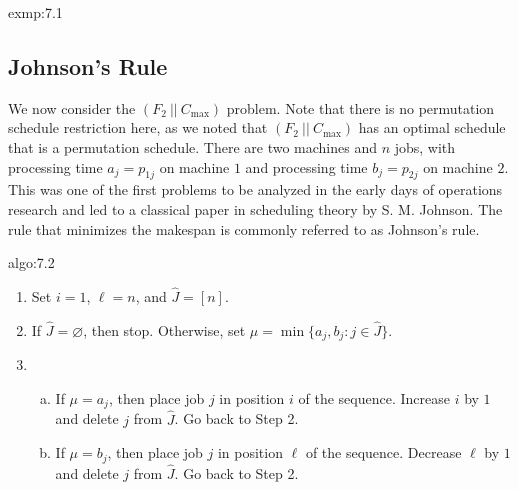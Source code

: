 \begin{exmp}{exmp:7.1}
\begin{center}
    \end{center}
\end{exmp}

\subsection{Johnson's Rule} \label{subsec:7.2}
We now consider the $(F_2~||~C_{\max})$ problem. Note that there 
is no permutation schedule restriction here, as we noted that 
$(F_2~||~C_{\max})$ has an optimal schedule that is a permutation schedule. 
There are two machines and $n$ jobs, with processing time $a_j = p_{1j}$ on 
machine $1$ and processing time $b_j = p_{2j}$ on machine $2$. This was one of 
the first problems to be analyzed in the early days of operations research 
and led to a classical paper in scheduling theory by S. M. Johnson. 
The rule that minimizes the makespan is commonly referred to as 
Johnson's rule. 

\begin{algo}{algo:7.2}
    \begin{enumerate}[(1)]
        \item Set $i = 1$, $\ell = n$, and $\hat J = [n]$. 
        \item If $\hat J = \varnothing$, then stop. Otherwise, set 
        $\mu = \min\{a_j, b_j : j \in \hat J\}$. 
        \item \begin{enumerate}[(a)]
            \item If $\mu = a_j$, then place job $j$ in position $i$
            of the sequence. Increase $i$ by $1$ and delete $j$ from 
            $\hat J$. Go back to Step 2. 
            \item If $\mu = b_j$, then place job $j$ in position $\ell$
            of the sequence. Decrease $\ell$ by $1$ and delete $j$ from 
            $\hat J$. Go back to Step 2. 
        \end{enumerate} 
    \end{enumerate}
\end{algo}

